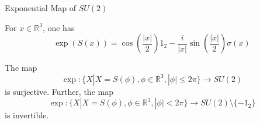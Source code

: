 \begin{frame}{Exponential Map of $SU(2)$}
    \begin{proposition}[10.2.5]
        For $x \in \mathbb{R}^3$, one has
        \[ \exp(S(x)) = \cos\left(\frac{|x|}{2}\right)1_2 - \frac{i}{|x|}\sin\left(\frac{|x|}{2}\right)\sigma(x) \]
    \end{proposition}

    \begin{proposition}[10.2.6]
        The map
        \[ \exp : \{X | X = S(\phi), \phi \in \mathbb{R}^3, |\phi| \leq 2\pi\} \rightarrow SU(2) \]
        is surjective. Further, the map
        \[ \exp : \{X | X = S(\phi), \phi \in \mathbb{R}^3, |\phi| < 2\pi\} \rightarrow SU(2) \setminus \{-1_2\} \]
        is invertible.
    \end{proposition}
\end{frame}